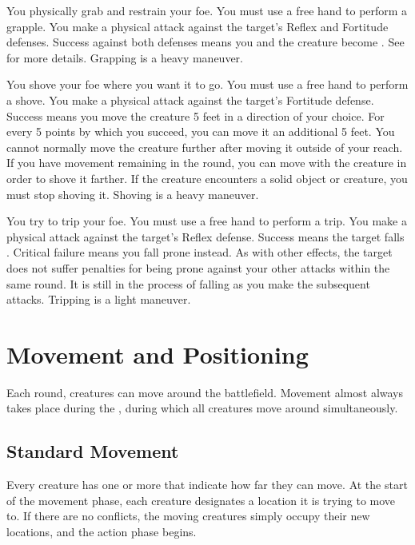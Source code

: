             \label{Grapple} You physically grab and restrain your foe.
            You must use a free hand to perform a grapple.
            You make a physical attack against the target's Reflex and Fortitude defenses.
            Success against both defenses means you and the creature become \grappled.
            See  for more details.
            Grapping is a heavy maneuver.

            \label{Shove} You shove your foe where you want it to go.
            You must use a free hand to perform a shove.
            You make a physical attack against the target's Fortitude defense.
            Success means you move the creature 5 feet in a direction of your choice.
            For every 5 points by which you succeed, you can move it an additional 5 feet.
            You cannot normally move the creature further after moving it outside of your reach.
            If you have movement remaining in the round, you can move with the creature in order to shove it farther.
            If the creature encounters a solid object or creature, you must stop shoving it.
            Shoving is a heavy maneuver.

            \label{Trip} You try to trip your foe.
            You must use a free hand to perform a trip.
            You make a physical attack against the target's Reflex defense.
            Success means the target falls \prone.
            Critical failure means you fall prone instead.
            As with other effects, the target does not suffer penalties for being prone against your other attacks within the same round.
            It is still in the process of falling as you make the subsequent attacks.
            Tripping is a light maneuver.

\section{Movement and Positioning}

    Each round, creatures can move around the battlefield.
    Movement almost always takes place during the , during which all creatures move around simultaneously.

    \subsection{Standard Movement}
        Every creature has one or more  that indicate how far they can move.
        At the start of the movement phase, each creature designates a location it is trying to move to.
        If there are no conflicts, the moving creatures simply occupy their new locations, and the action phase begins.

